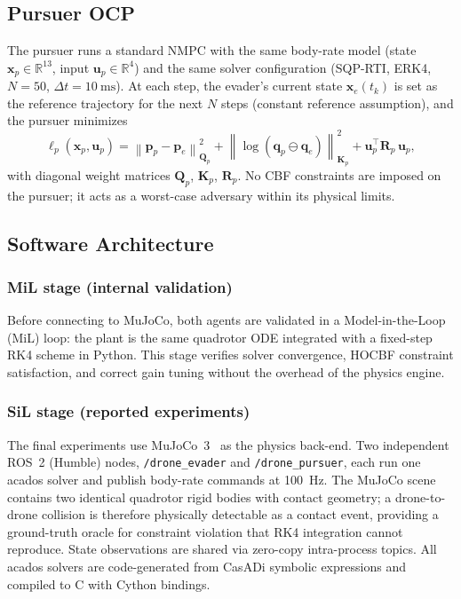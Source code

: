 \documentclass[lettersize,journal]{IEEEtran}
\theoremstyle{definition}
\theoremstyle{remark}
\newcommand{\R}{\mathbb{R}}
\newcommand{\norm}[1]{\left\| #1 \right\|}
\newcommand{\vect}[1]{\bm{#1}}
\newcommand{\mat}[1]{\mathbf{#1}}
\begin{document}
\subsection{Pursuer OCP}
\label{sec:pursuer_ocp}

The pursuer runs a standard NMPC with the same body-rate model
(state $\vect{x}_p \in \R^{13}$, input $\vect{u}_p \in \R^4$)
and the same solver configuration (SQP-RTI, ERK4, $N=50$,
$\Delta t=\SI{10}{\milli\second}$).
At each step, the evader's current state $\vect{x}_e(t_k)$ is set
as the reference trajectory for the next $N$ steps (constant
reference assumption), and the pursuer minimizes
\begin{equation}
    \ell_p(\vect{x}_p,\vect{u}_p)
        = \norm{\vect{p}_p - \vect{p}_e}^2_{\mat{Q}_p}
          + \norm{\log(\vect{q}_p \ominus \vect{q}_e)}^2_{\mat{K}_p}
          + \vect{u}_p^\top \mat{R}_p\,\vect{u}_p,
    \label{eq:pursuer_cost}
\end{equation}
with diagonal weight matrices $\mat{Q}_p$, $\mat{K}_p$, $\mat{R}_p$.
No CBF constraints are imposed on the pursuer; it acts as a
worst-case adversary within its physical limits.

\subsection{Software Architecture}
\label{sec:software}

\subsubsection*{MiL stage (internal validation)}
Before connecting to MuJoCo, both agents are validated in a
Model-in-the-Loop (MiL) loop: the plant is the same quadrotor ODE
integrated with a fixed-step RK4 scheme in Python.
This stage verifies solver convergence, HOCBF constraint satisfaction,
and correct gain tuning without the overhead of the physics engine.

\subsubsection*{SiL stage (reported experiments)}
The final experiments use MuJoCo~3~\cite{todorov2012mujoco} as the
physics back-end.
Two independent ROS~2 (Humble) nodes,
\texttt{/drone\_evader} and \texttt{/drone\_pursuer},
each run one acados solver and publish body-rate commands at
\SI{100}{\hertz}.
The MuJoCo scene contains two identical quadrotor rigid bodies with
contact geometry; a drone-to-drone collision is therefore physically
detectable as a contact event, providing a ground-truth oracle for
constraint violation that RK4 integration cannot reproduce.
State observations are shared via zero-copy intra-process topics.
All acados solvers are code-generated from CasADi symbolic expressions
and compiled to C with Cython bindings.
\end{document}
